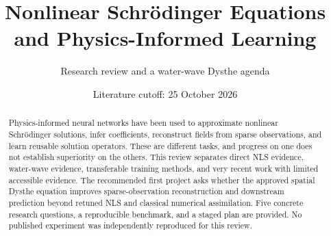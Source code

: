 \documentclass[11pt]{article}
\title{Nonlinear Schr\"odinger Equations\\and Physics-Informed Learning}
\author{Research review and a water-wave Dysthe agenda}
\date{Literature cutoff: 25 October 2026}
\begin{document}
\maketitle
\begin{abstract}
Physics-informed neural networks have been used to approximate nonlinear
Schr\"odinger solutions, infer coefficients, reconstruct fields from sparse
observations, and learn reusable solution operators. These are different
tasks, and progress on one does not establish superiority on the others.
This review separates direct NLS evidence, water-wave evidence, transferable
training methods, and very recent work with limited accessible evidence.
The recommended first project asks whether the approved spatial Dysthe
equation improves sparse-observation reconstruction and downstream prediction
beyond retuned NLS and classical numerical assimilation. Five concrete
research questions, a reproducible benchmark, and a staged plan are provided.
No published experiment was independently reproduced for this review.
\end{abstract}
\tableofcontents






\end{document}
